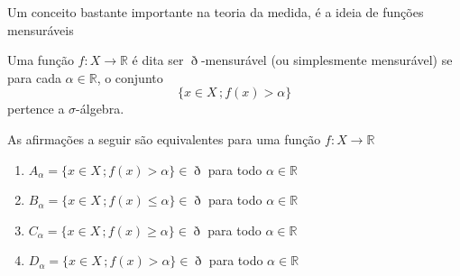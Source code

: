 \documentclass[a4paper, 11pt]{book}
\theoremstyle{definition}
\newcommand{\bR}{\mathbb{R}}
\newcommand{\cB}{\mathcal{B}}
\begin{document}
\begin{prf}

\end{prf}

Um conceito bastante importante na teoria da medida, é a ideia de funções mensuráveis

\begin{dbox}
    Uma função $f : X \to \mathbb R$ é dita ser $\eth$-mensurável (ou simplesmente mensurável) se para cada $\alpha \in \mathbb{R}$, o conjunto
    \[
        \{x \in X \,; f(x) > \alpha\}
    \]
    pertence a $\sigma$-álgebra.
\end{dbox}

\begin{lbox}
    As afirmações a seguir são equivalentes para uma função $f : X \to \bR$
    \begin{enumerate}[leftmargin=*, label=\textbf{(\alph*)}]
        \item $A_\alpha = \{x \in X \,; f(x) > \alpha\} \in \eth$ para todo $\alpha \in \bR$
        \item $B_\alpha = \{x \in X \,; f(x) \leqslant \alpha\} \in \eth$ para todo $\alpha \in \bR$
        \item $C_\alpha = \{x \in X \,; f(x) \geqslant \alpha\} \in \eth$ para todo $\alpha \in \bR$
        \item $D_\alpha = \{x \in X \,; f(x) > \alpha\} \in \eth$ para todo $\alpha \in \bR$
    \end{enumerate}
\end{lbox}
\begin{prf}
    ~
\end{prf}
\end{document}
